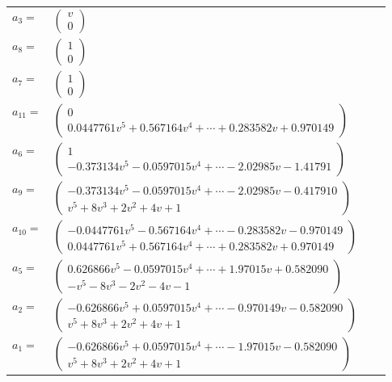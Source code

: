 \documentclass[1p]{elsarticle_modified}
\theoremstyle{definition}
\begin{document}
\begin{tabular}{m{7pt} m{180pt} m{7pt} m{180pt} }
\flushright $a_{3}=$&$\begin{pmatrix}v\\0\end{pmatrix}$ \\
\flushright $a_{8}=$&$\begin{pmatrix}1\\0\end{pmatrix}$ \\
\flushright $a_{7}=$&$\begin{pmatrix}1\\0\end{pmatrix}$ \\
\flushright $a_{11}=$&$\begin{pmatrix}0\\0.0447761 v^{5}+0.567164 v^{4}+\cdots+0.283582 v+0.970149\end{pmatrix}$ \\
\flushright $a_{6}=$&$\begin{pmatrix}1\\-0.373134 v^{5}-0.0597015 v^{4}+\cdots-2.02985 v-1.41791\end{pmatrix}$ \\
\flushright $a_{9}=$&$\begin{pmatrix}-0.373134 v^{5}-0.0597015 v^{4}+\cdots-2.02985 v-0.417910\\v^5+8 v^3+2 v^2+4 v+1\end{pmatrix}$ \\
\flushright $a_{10}=$&$\begin{pmatrix}-0.0447761 v^{5}-0.567164 v^{4}+\cdots-0.283582 v-0.970149\\0.0447761 v^{5}+0.567164 v^{4}+\cdots+0.283582 v+0.970149\end{pmatrix}$ \\
\flushright $a_{5}=$&$\begin{pmatrix}0.626866 v^{5}-0.0597015 v^{4}+\cdots+1.97015 v+0.582090\\- v^5-8 v^3-2 v^2-4 v-1\end{pmatrix}$ \\
\flushright $a_{2}=$&$\begin{pmatrix}-0.626866 v^{5}+0.0597015 v^{4}+\cdots-0.970149 v-0.582090\\v^5+8 v^3+2 v^2+4 v+1\end{pmatrix}$ \\
\flushright $a_{1}=$&$\begin{pmatrix}-0.626866 v^{5}+0.0597015 v^{4}+\cdots-1.97015 v-0.582090\\v^5+8 v^3+2 v^2+4 v+1\end{pmatrix}$ \\

\end{tabular}
\end{document}
